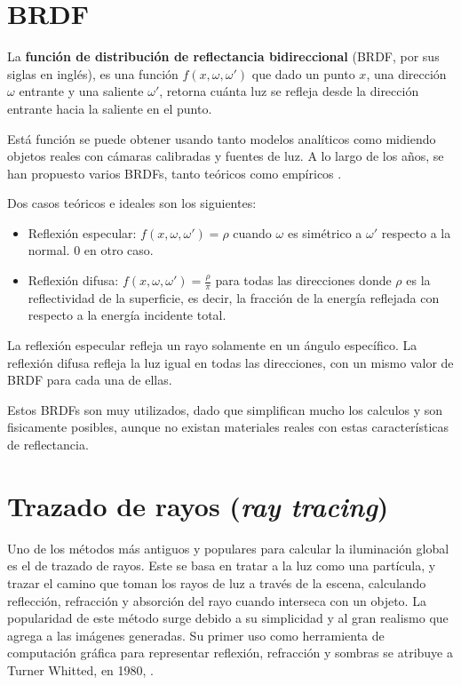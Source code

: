 \section{BRDF}\label{sec:brdf}

La \textbf{función de distribución de reflectancia bidireccional} (BRDF, por sus siglas en inglés), es una función $f(x, \omega, \omega')$ que dado un punto $x$, una dirección $\omega$ entrante y una saliente $\omega'$, retorna cuánta luz se refleja desde la dirección entrante hacia la saliente en el punto.

Está función se puede obtener usando tanto modelos analíticos como midiendo objetos reales con cámaras calibradas y fuentes de luz.
A lo largo de los años, se han propuesto varios BRDFs, tanto teóricos como empíricos \cite{review-of-brdf-models}.


Dos casos teóricos e ideales son los siguientes:

\begin{itemize}
    \item Reflexión especular: $f(x, \omega, \omega') = \rho$ cuando $\omega$ es simétrico a $\omega'$ respecto a la normal. $0$ en otro caso.
    \item Reflexión difusa: $f(x, \omega, \omega') = \frac{\rho}{\pi}$ para todas las direcciones donde $\rho$ es la reflectividad de la superficie, es decir, la fracción de la energía reflejada con respecto a la energía incidente total.
\end{itemize}

La reflexión especular refleja un rayo solamente en un ángulo específico.
La reflexión difusa refleja la luz igual en todas las direcciones, con un mismo valor de BRDF para cada una de ellas.

Estos BRDFs son muy utilizados, dado que simplifican mucho los calculos y son fisicamente posibles, aunque no existan materiales reales con estas características de reflectancia.

\section{Trazado de rayos (\textit{ray tracing})}\label{sec:ray-tracing}

Uno de los métodos más antiguos y populares para calcular la iluminación global es el de trazado de rayos.
Este se basa en tratar a la luz como una partícula, y trazar el camino que toman los rayos de luz a través de la escena, calculando reflección, refracción y absorción del rayo cuando interseca con un objeto.
La popularidad de este método surge debido a su simplicidad y al gran realismo que agrega a las imágenes generadas.
Su primer uso como herramienta de computación gráfica para representar reflexión, refracción y sombras se atribuye a Turner Whitted, en 1980, \cite{whitted-1980}.

